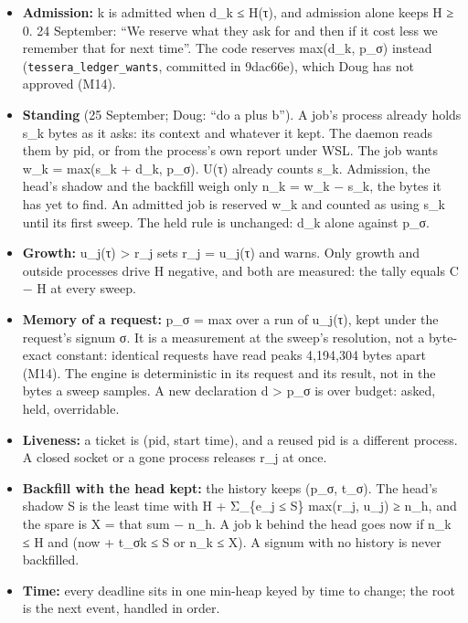 \begin{itemize}
\item \textbf{Admission:} k is admitted when d\_\allowbreak{}k ≤ H(τ), and admission alone keeps H ≥ 0. 24 September: “We reserve what they ask for and then if it cost less we remember that for next time”. The code reserves max(d\_\allowbreak{}k, p\_\allowbreak{}σ) instead (\texttt{tessera\_\allowbreak{}ledger\_\allowbreak{}wants}, committed in 9dac66e), which Doug has not approved (M14).
\item \textbf{Standing} (25 September; Doug: “do a plus b”). A job's process already holds s\_\allowbreak{}k bytes as it asks: its context and whatever it kept. The daemon reads them by pid, or from the process's own report under WSL. The job wants w\_\allowbreak{}k = max(s\_\allowbreak{}k + d\_\allowbreak{}k, p\_\allowbreak{}σ). U(τ) already counts s\_\allowbreak{}k. Admission, the head's shadow and the backfill weigh only n\_\allowbreak{}k = w\_\allowbreak{}k − s\_\allowbreak{}k, the bytes it has yet to find. An admitted job is reserved w\_\allowbreak{}k and counted as using s\_\allowbreak{}k until its first sweep. The held rule is unchanged: d\_\allowbreak{}k alone against p\_\allowbreak{}σ.
\item \textbf{Growth:} u\_\allowbreak{}j(τ) > r\_\allowbreak{}j sets r\_\allowbreak{}j = u\_\allowbreak{}j(τ) and warns. Only growth and outside processes drive H negative, and both are measured: the tally equals C − H at every sweep.
\item \textbf{Memory of a request:} p\_\allowbreak{}σ = max over a run of u\_\allowbreak{}j(τ), kept under the request's signum σ. It is a measurement at the sweep's resolution, not a byte-exact constant: identical requests have read peaks 4,194,304 bytes apart (M14). The engine is deterministic in its request and its result, not in the bytes a sweep samples. A new declaration d > p\_\allowbreak{}σ is over budget: asked, held, overridable.
\item \textbf{Liveness:} a ticket is (pid, start time), and a reused pid is a different process. A closed socket or a gone process releases r\_\allowbreak{}j at once.
\item \textbf{Backfill with the head kept:} the history keeps (p\_\allowbreak{}σ, t\_\allowbreak{}σ). The head's shadow S is the least time with H + Σ\_\allowbreak{}\{e\_\allowbreak{}j ≤ S\} max(r\_\allowbreak{}j, u\_\allowbreak{}j) ≥ n\_\allowbreak{}h, and the spare is X = that sum − n\_\allowbreak{}h. A job k behind the head goes now if n\_\allowbreak{}k ≤ H and (now + t\_\allowbreak{}σk ≤ S or n\_\allowbreak{}k ≤ X). A signum with no history is never backfilled.
\item \textbf{Time:} every deadline sits in one min-heap keyed by time to change; the root is the next event, handled in order.
\end{itemize}

